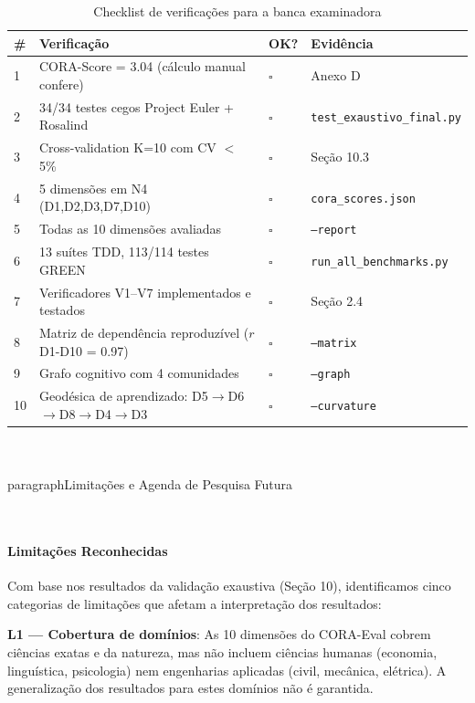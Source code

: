 \begin{table}[H]\centering\caption{Checklist de verificações para a banca examinadora}
\label{tab:checklist}
\begin{tabular}{p{}p{}p{}p{}}
\toprule
\textbf{\#} & \textbf{Verificação} & \textbf{OK?} & \textbf{Evidência} \\
\midrule
1 & CORA-Score = 3.04 (cálculo manual confere) & $\square$ & Anexo D \\
2 & 34/34 testes cegos Project Euler + Rosalind & $\square$ & \texttt{test\_exaustivo\_final.py} \\
3 & Cross-validation K=10 com CV $<$ 5\% & $\square$ & Seção 10.3 \\
4 & 5 dimensões em N4 (D1,D2,D3,D7,D10) & $\square$ & \texttt{cora\_scores.json} \\
5 & Todas as 10 dimensões avaliadas & $\square$ & \texttt{--report} \\
6 & 13 suítes TDD, 113/114 testes GREEN & $\square$ & \texttt{run\_all\_benchmarks.py} \\
7 & Verificadores V1--V7 implementados e testados & $\square$ & Seção 2.4 \\
8 & Matriz de dependência reproduzível ($r$ D1-D10 = 0.97) & $\square$ & \texttt{--matrix} \\
9 & Grafo cognitivo com 4 comunidades & $\square$ & \texttt{--graph} \\
10 & Geodésica de aprendizado: D5$\to$D6$\to$D8$\to$D4$\to$D3 & $\square$ & \texttt{--curvature} \\
\bottomrule
\end{tabular}
\end{table}

\\\\paragraph{Limitações e Agenda de Pesquisa Futura}

\\\paragraph{Limitações Reconhecidas}

Com base nos resultados da validação exaustiva (Seção 10), identificamos
cinco categorias de limitações que afetam a interpretação dos resultados:

\textbf{L1 — Cobertura de domínios}: As 10 dimensões do CORA-Eval cobrem
ciências exatas e da natureza, mas não incluem ciências humanas (economia,
linguística, psicologia) nem engenharias aplicadas (civil, mecânica, elétrica).
A generalização dos resultados para estes domínios não é garantida.

